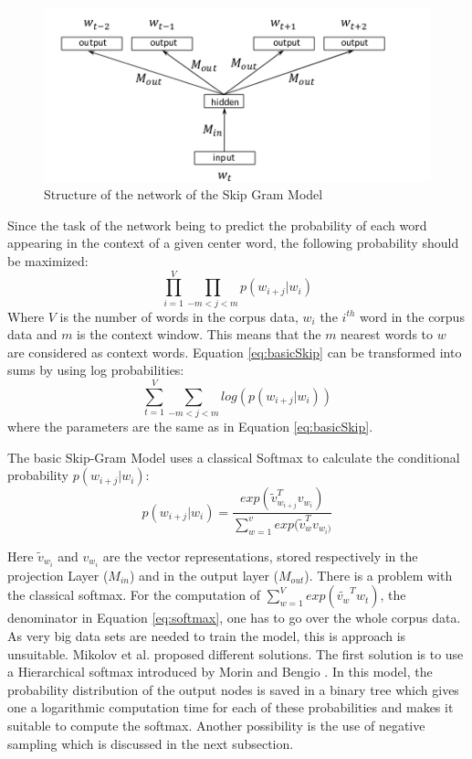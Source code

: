 \begin{figure}[ht]
\centering
\includegraphics[scale=0.625]{images/ntw_architecture}
\caption{Structure of the network of the Skip Gram Model}
\label{fig:ntw_architecture}
\end{figure}
Since the task of the network being to predict the probability of each word appearing in the context of a given center word, the following probability should be maximized:\\
\begin{equation} \label{eq:basicSkip}
\prod_{i=1}^V \prod_{-m<j<m} p(w_{i+j}|w_i)
\end{equation}
Where $V$ is the number of words in the corpus data, $w_i$ the $i^{th}$ word in the corpus data and $m$ is the context window. This means that the $m$ nearest words to $w$ are considered as context words.
Equation \ref{eq:basicSkip} can be transformed into sums by using log probabilities:
\begin{equation}
\sum _{t=1}^V \sum_{-m<j<m} log( p(w_{i+j}|w_i) )
\end{equation}
where the parameters are the same as in Equation \ref{eq:basicSkip}.

The basic Skip-Gram Model uses a classical Softmax to calculate the conditional probability $p(w_{i+j}|w_i)$:
\begin{equation} \label{eq:softmax}
p(w_{i+j}|w_i)= \frac{exp( \tilde{v}_{w_{i+j}}^Tv_{w_i})}{\sum_{w=1}^v exp(\tilde{v}_w^Tv_{ w_i)}}
\end{equation}

Here $\tilde{v}_{w_i}$ and $ v_{w_i}$ are the vector representations, stored respectively in the projection Layer ($M_{in}$) and in the output layer ($M_{out}$). There is a problem with the classical softmax. For the computation of $\sum_{w=1}^V exp(\tilde{v_w}^T w_t)$, the denominator in Equation \ref{eq:softmax}, one has to go over the whole corpus data. As very big data sets are needed to train the model, this is approach is unsuitable. Mikolov et al. \cite{mikolov2} proposed different solutions. The first solution is to use a Hierarchical softmax introduced by Morin and Bengio \cite{hsoftmax}. In this model, the probability distribution of the output nodes is saved in a binary tree which gives one a logarithmic computation time for each of these probabilities and makes it suitable to compute the softmax. Another possibility is the use of negative sampling which is discussed in the next subsection.

